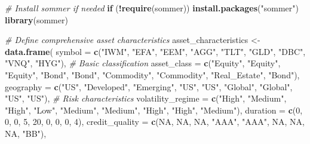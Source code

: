 \documentclass[
]{article}
\newenvironment{Shaded}{\begin{snugshade}}{\end{snugshade}}
\newcommand{\AttributeTok}[1]{\textcolor[rgb]{0.13,0.29,0.53}{#1}}
\newcommand{\CommentTok}[1]{\textcolor[rgb]{0.56,0.35,0.01}{\textit{#1}}}
\newcommand{\ConstantTok}[1]{\textcolor[rgb]{0.56,0.35,0.01}{#1}}
\newcommand{\ControlFlowTok}[1]{\textcolor[rgb]{0.13,0.29,0.53}{\textbf{#1}}}
\newcommand{\DecValTok}[1]{\textcolor[rgb]{0.00,0.00,0.81}{#1}}
\newcommand{\FunctionTok}[1]{\textcolor[rgb]{0.13,0.29,0.53}{\textbf{#1}}}
\newcommand{\NormalTok}[1]{#1}
\newcommand{\OtherTok}[1]{\textcolor[rgb]{0.56,0.35,0.01}{#1}}
\newcommand{\SpecialCharTok}[1]{\textcolor[rgb]{0.81,0.36,0.00}{\textbf{#1}}}
\newcommand{\StringTok}[1]{\textcolor[rgb]{0.31,0.60,0.02}{#1}}
\begin{document}
\begin{Shaded}
\begin{Highlighting}[]
\CommentTok{\# Install sommer if needed}
\ControlFlowTok{if}\NormalTok{ (}\SpecialCharTok{!}\FunctionTok{require}\NormalTok{(sommer)) }\FunctionTok{install.packages}\NormalTok{(}\StringTok{"sommer"}\NormalTok{)}
\FunctionTok{library}\NormalTok{(sommer)}

\CommentTok{\# Define comprehensive asset characteristics}
\NormalTok{asset\_characteristics }\OtherTok{\textless{}{-}} \FunctionTok{data.frame}\NormalTok{(}
  \AttributeTok{symbol =} \FunctionTok{c}\NormalTok{(}\StringTok{"IWM"}\NormalTok{, }\StringTok{"EFA"}\NormalTok{, }\StringTok{"EEM"}\NormalTok{, }\StringTok{"AGG"}\NormalTok{, }\StringTok{"TLT"}\NormalTok{, }\StringTok{"GLD"}\NormalTok{, }\StringTok{"DBC"}\NormalTok{, }\StringTok{"VNQ"}\NormalTok{, }\StringTok{"HYG"}\NormalTok{),}
  \CommentTok{\# Basic classification}
  \AttributeTok{asset\_class =} \FunctionTok{c}\NormalTok{(}\StringTok{"Equity"}\NormalTok{, }\StringTok{"Equity"}\NormalTok{, }\StringTok{"Equity"}\NormalTok{, }\StringTok{"Bond"}\NormalTok{, }\StringTok{"Bond"}\NormalTok{, }
                  \StringTok{"Commodity"}\NormalTok{, }\StringTok{"Commodity"}\NormalTok{, }\StringTok{"Real\_Estate"}\NormalTok{, }\StringTok{"Bond"}\NormalTok{),}
  \AttributeTok{geography =} \FunctionTok{c}\NormalTok{(}\StringTok{"US"}\NormalTok{, }\StringTok{"Developed"}\NormalTok{, }\StringTok{"Emerging"}\NormalTok{, }\StringTok{"US"}\NormalTok{, }\StringTok{"US"}\NormalTok{, }
                \StringTok{"Global"}\NormalTok{, }\StringTok{"Global"}\NormalTok{, }\StringTok{"US"}\NormalTok{, }\StringTok{"US"}\NormalTok{),}
  \CommentTok{\# Risk characteristics}
  \AttributeTok{volatility\_regime =} \FunctionTok{c}\NormalTok{(}\StringTok{"High"}\NormalTok{, }\StringTok{"Medium"}\NormalTok{, }\StringTok{"High"}\NormalTok{, }\StringTok{"Low"}\NormalTok{, }\StringTok{"Medium"}\NormalTok{, }
                       \StringTok{"Medium"}\NormalTok{, }\StringTok{"High"}\NormalTok{, }\StringTok{"High"}\NormalTok{, }\StringTok{"Medium"}\NormalTok{),}
  \AttributeTok{duration =} \FunctionTok{c}\NormalTok{(}\DecValTok{0}\NormalTok{, }\DecValTok{0}\NormalTok{, }\DecValTok{0}\NormalTok{, }\DecValTok{5}\NormalTok{, }\DecValTok{20}\NormalTok{, }\DecValTok{0}\NormalTok{, }\DecValTok{0}\NormalTok{, }\DecValTok{0}\NormalTok{, }\DecValTok{4}\NormalTok{),}
  \AttributeTok{credit\_quality =} \FunctionTok{c}\NormalTok{(}\ConstantTok{NA}\NormalTok{, }\ConstantTok{NA}\NormalTok{, }\ConstantTok{NA}\NormalTok{, }\StringTok{"AAA"}\NormalTok{, }\StringTok{"AAA"}\NormalTok{, }\ConstantTok{NA}\NormalTok{, }\ConstantTok{NA}\NormalTok{, }\ConstantTok{NA}\NormalTok{, }\StringTok{"BB"}\NormalTok{),}

\end{Highlighting}
\end{Shaded}
\end{document}

